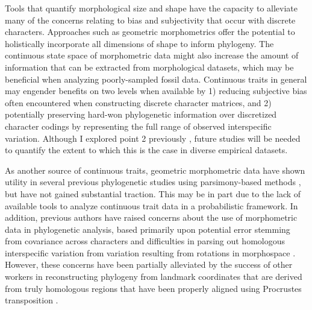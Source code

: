 \documentclass[12pt]{article}
\begin{document}
Tools that quantify morphological size and shape have the capacity to alleviate many of the concerns relating to bias and
subjectivity that occur with discrete characters. Approaches such as
geometric morphometrics offer the potential to holistically incorporate
all dimensions of shape to inform phylogeny. The continuous state space
of morphometric data might also increase the amount of information that
can be extracted from morphological datasets, which may be beneficial
when analyzing poorly-sampled fossil data. Continuous traits in general may engender 
benefits on two levels when available by 1) reducing subjective bias often encountered
when constructing discrete character matrices, and 2) potentially preserving hard-won
phylogenetic information over discretized character codings by representing the full
range of observed interspecific variation. Although I explored point 2 previously \citep{parins2017use},
future studies will be needed to quantify the extent to which this is the case in diverse 
empirical datasets.

 As another source of continuous traits, geometric morphometric data have shown
utility in several previous phylogenetic studies using parsimony-based
methods \citep{geomorphhominin,catalano2010phylogenetic,smith2013geometric}, but have not gained substantial traction. This may be in part due to the lack of available tools to analyze
continuous trait data in a probabilistic framework. In addition, previous authors have raised concerns about the use of morphometric data in phylogenetic analysis, based primarily upon potential error stemming from covariance across characters and difficulties in parsing out homologous interspecific variation from variation resulting from rotations in morphospace \citep{felsenstein2002quantitative}. However, these concerns have been partially alleviated by the success of other workers in reconstructing phylogeny from landmark coordinates that are derived from truly homologous regions that have been properly aligned using Procrustes transposition \citep{macleod2001role,macleod2002phylogenetic,catalano2010phylogenetic,goloboff2016tnt}. 
\end{document}
